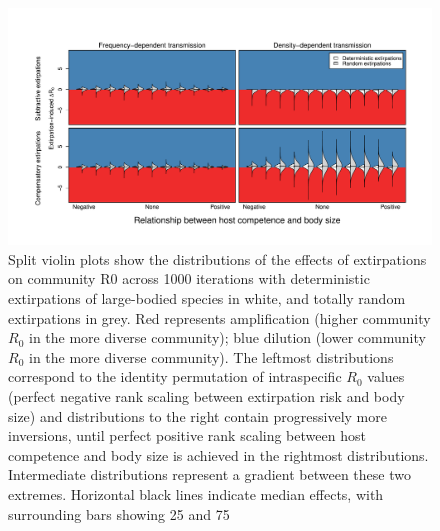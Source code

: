 \begin{figure}
	\caption[Effects of extirpation on disease risk with random extictions]{
	Split violin plots show the distributions of the effects of extirpations on community R0 across 1000 iterations with deterministic extirpations of large-bodied species in white, and totally random extirpations in grey. Red represents amplification (higher community $R_0$ in the more diverse community); blue dilution (lower community $R_0$ in the more diverse community). The leftmost distributions correspond to the identity permutation of intraspecific $R_0$ values (perfect negative rank scaling between extirpation risk and body size) and distributions to the right contain progressively more inversions, until perfect positive rank scaling between host competence and body size is achieved in the rightmost distributions. Intermediate distributions represent a gradient between these two extremes. Horizontal black lines indicate median effects, with surrounding bars showing 25 and 75%
	}
    \begin{center}
	\includegraphics[width=150mm]{figs/ch2/figS3.pdf}
    \end{center}
\label{2-s3}
\end{figure}

